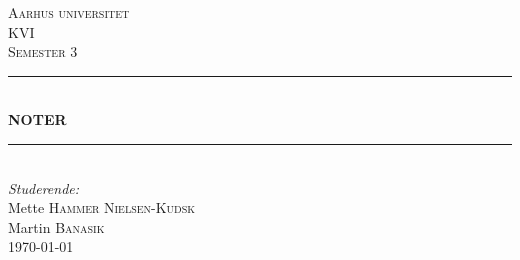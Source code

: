 \documentclass[12pt, letterpaper]{article}
\begin{document}
\begin{titlepage}

\newcommand{\HRule}{\rule{\linewidth}{0.5mm}} %

\center %
 

\textsc{\LARGE Aarhus universitet}\\[1.5cm] %
\textsc{\Large KVI}\\[0.5cm] %
\textsc{\large Semester 3}\\[0.5cm] %


\HRule \\[0.4cm]
{ \huge \bfseries NOTER}\\[0.4cm] %
\HRule \\[1.5cm]
 

\Large \emph{Studerende:}\\[1cm]
Mette \textsc{Hammer Nielsen-Kudsk}\\[0,5cm] %
Martin \textsc{Banasik}\\[1cm] %

{\large \today}\\[1,2cm] %



\end{titlepage}
\end{document}
